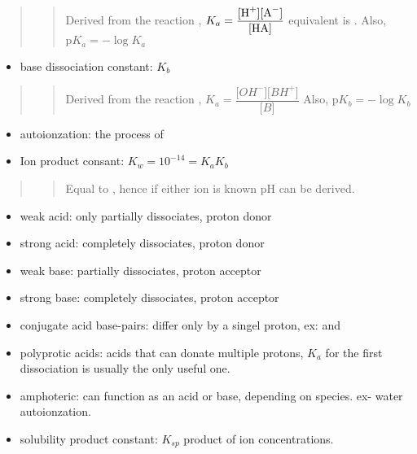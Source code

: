 \documentclass[]{article}
\providecommand{\tightlist}{%
  \setlength{\itemsep}{0pt}\setlength{\parskip}{0pt}}
\begin{document}
\begin{quote}
\begin{quote}
Derived from the reaction ,
\(K_a=\dfrac{\ce{\lbrack H^{+}\rbrack \lbrack A^{-}\rbrack }}{\ce{\lbrack HA\rbrack }}\)
equivalent is . Also,
\(\text{p}K_a = -\log{K_a}\)
\end{quote}
\end{quote}

\begin{itemize}
\tightlist
\item
  base dissociation constant: \(K_b\)
\end{itemize}

\begin{quote}
\begin{quote}
Derived from the reaction ,
\(K_a=\dfrac{\lbrack OH^{-}\rbrack \lbrack BH^{+}\rbrack }{\lbrack B\rbrack }\)
Also, \(\text{p}K_b = -\log{K_b}\)
\end{quote}
\end{quote}

\begin{itemize}
\tightlist
\item
  autoionzation: the process of 
\item
  Ion product consant: \(K_w=10^{-14}=K_aK_b\)
\end{itemize}

\begin{quote}
\begin{quote}
Equal to , hence if
either ion is known pH can be derived.
\end{quote}
\end{quote}

\begin{itemize}
\item
  weak acid: only partially dissociates, proton donor
\item
  strong acid: completely dissociates, proton donor
\item
  weak base: partially dissociates, proton acceptor
\item
  strong base: completely dissociates, proton acceptor
\item
  conjugate acid base-pairs: differ only by a singel proton, ex:
   and 
\item
  polyprotic acids: acids that can donate multiple protons, \(K_a\) for
  the first dissociation is usually the only useful one.
\item
  amphoteric: can function as an acid or base, depending on species. ex-
  water autoionzation.
\item
  solubility product constant: \(K_{sp}\) product of ion concentrations.
\end{itemize}
\end{document}
